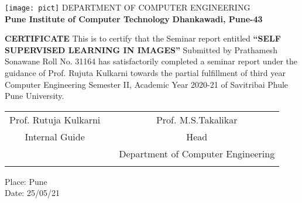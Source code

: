 \documentclass[a4paper, 12pt]{article}
\begin{document}
\begin{titlepage}
\begin{center}
	\texttt{[image: pict]} 
	\linebreak
	\Large
        DEPARTMENT OF COMPUTER ENGINEERING\\
        \textbf{Pune Institute of Computer Technology}
		\linebreak
		\textbf{Dhankawadi, Pune-43}
		\vspace{0.8cm}
		\Large
		
	    \textbf{CERTIFICATE}
	    		\linebreak
	    \linebreak
		This is to certify that the Seminar report entitled
        \linebreak
		\linebreak
		\large
		\textbf{“SELF SUPERVISED LEARNING IN IMAGES”}
		\linebreak
		\linebreak
		Submitted by
		\linebreak
		Prathamesh Sonawane \hspace{10mm}   Roll No. 31164 \linebreak
		\linebreak
		has satisfactorily completed a seminar report under the guidance of Prof. Rujuta Kulkarni towards the partial fulfillment of third year Computer Engineering Semester II, Academic Year 2020-21 of Savitribai Phule Pune University. 
		\linebreak
		\linebreak
		\linebreak
		\linebreak
		\linebreak
		\begin{table}[h]
		\begin{tabular}{ccc}
		Prof. Rutuja Kulkarni    & &  \hspace{52mm} Prof. M.S.Takalikar\\
		Internal Guide      &                     &    \hspace{52mm} Head \\
		          &                         &       \hspace{47mm} Department of Computer Engineering \\
                    &                       & \hspace{52mm} 
		\end{tabular}
		\end{table}
		\end{center}
Place: Pune\\
Date: 25/05/21

\end{titlepage} 
\end{document}
